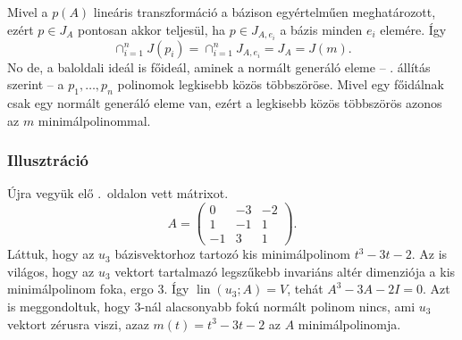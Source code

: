 \documentclass[9pt, a4paper, showtrims]{memoir}
\makeatletter
\renewenvironment{proof}[1][\proofname]
    {\par\pushQED{\qed}%
    \normalfont \topsep6\p@\@plus6\p@\relax
    \trivlist
    \item[\hskip\labelsep
        \itshape
    #1\@addpunct{:}]\ignorespaces}
    {\popQED\endtrivlist\@endpefalse}
\theoremstyle{plain}
\theoremstyle{remark}
\theoremstyle{definition}
\DeclareMathOperator{\lin}{lin}
\makeatother
\begin{document}
\begin{proof}[Egy másik bizonyítás]
	Mivel a $p\left( A \right)$ lineáris transzformáció a bázison egyértelműen meghatározott,
	ezért $p\in J_A$ pontosan akkor teljesül,
	ha $p\in J_{A,e_i}$ a bázis minden $e_i$ elemére.
	Így
	\[
		\cap_{i=1}^nJ(p_i)
		=
		\cap_{i=1}^nJ_{A,e_i}
		=
		J_A
		=
		J(m).
	\]
	No de, a baloldali ideál is főideál, aminek a normált generáló eleme
	-- . állítás szerint --
	a $p_1,\ldots,p_n$ polinomok legkisebb közös többszöröse.
	Mivel egy főidálnak csak egy normált generáló eleme van,
	ezért a legkisebb közös többszörös azonos az $m$ minimálpolinommal.
\end{proof}
\subsubsection{Illusztráció}\label{se:minimalillusztracio}
Újra vegyük elő .~oldalon vett mátrixot.
\[
    A=
    \begin{pmatrix}
        0&-3&-2\\
        1&-1&1\\
        -1&3&1
    \end{pmatrix}.
\]
Láttuk, hogy az $u_3$ bázisvektorhoz tartozó kis minimálpolinom $t^3-3t-2$.
Az is világos, hogy az $u_3$ vektort tartalmazó legszűkebb invariáns altér dimenziója a kis minimálpolinom foka, 
ergo 3.
Így $\lin\left( u_3;A \right)=V$, tehát $A^3-3A-2I=0$.
Azt is meggondoltuk, hogy $3$-nál alacsonyabb fokú normált polinom nincs, ami $u_3$ vektort zérusra viszi,
azaz $m\left( t \right)=t^{3}-3t-2$ az $A$ minimálpolinomja.
\end{document}

